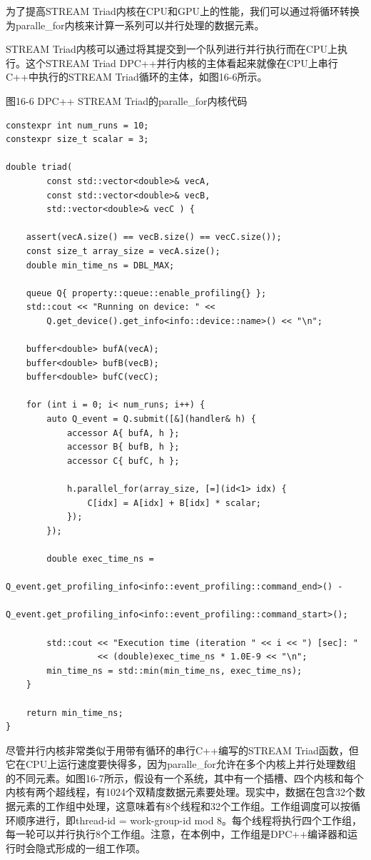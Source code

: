 为了提高STREAM Triad内核在CPU和GPU上的性能，我们可以通过将循环转换为paralle\_for内核来计算一系列可以并行处理的数据元素。\par

STREAM Triad内核可以通过将其提交到一个队列进行并行执行而在CPU上执行。这个STREAM Triad DPC++并行内核的主体看起来就像在CPU上串行C++中执行的STREAM Triad循环的主体，如图16-6所示。\par

\hspace*{\fill} \par %
图16-6 DPC++ STREAM Triad的paralle\_for内核代码
\begin{lstlisting}[caption={}]
constexpr int num_runs = 10;
constexpr size_t scalar = 3;

double triad(
		const std::vector<double>& vecA,
		const std::vector<double>& vecB,
		std::vector<double>& vecC ) {
			
	assert(vecA.size() == vecB.size() == vecC.size());
	const size_t array_size = vecA.size();
	double min_time_ns = DBL_MAX;
	
	queue Q{ property::queue::enable_profiling{} };
	std::cout << "Running on device: " <<
		Q.get_device().get_info<info::device::name>() << "\n";
	
	buffer<double> bufA(vecA);
	buffer<double> bufB(vecB);
	buffer<double> bufC(vecC);
	
	for (int i = 0; i< num_runs; i++) {
		auto Q_event = Q.submit([&](handler& h) {
			accessor A{ bufA, h };
			accessor B{ bufB, h };
			accessor C{ bufC, h };
			
			h.parallel_for(array_size, [=](id<1> idx) {
				C[idx] = A[idx] + B[idx] * scalar;
			});
		});
	
		double exec_time_ns =
			Q_event.get_profiling_info<info::event_profiling::command_end>() -
			Q_event.get_profiling_info<info::event_profiling::command_start>();
		
		std::cout << "Execution time (iteration " << i << ") [sec]: "
				  << (double)exec_time_ns * 1.0E-9 << "\n";
		min_time_ns = std::min(min_time_ns, exec_time_ns);
	}

	return min_time_ns;
}
\end{lstlisting}

尽管并行内核非常类似于用带有循环的串行C++编写的STREAM Triad函数，但它在CPU上运行速度要快得多，因为paralle\_for允许在多个内核上并行处理数组的不同元素。如图16-7所示，假设有一个系统，其中有一个插槽、四个内核和每个内核有两个超线程，有1024个双精度数据元素要处理。现实中，数据在包含32个数据元素的工作组中处理，这意味着有8个线程和32个工作组。工作组调度可以按循环顺序进行，即thread-id = work-group-id mod 8。每个线程将执行四个工作组，每一轮可以并行执行8个工作组。注意，在本例中，工作组是DPC++编译器和运行时会隐式形成的一组工作项。\par

